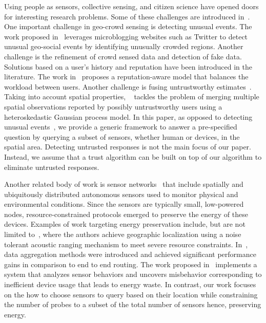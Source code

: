 \documentclass{acm_proc_article-sp}
\begin{document}
Using people as sensors, collective sensing, and citizen science have opened doors for interesting research problems. Some of these challenges are introduced in~\cite{blaschke2011collective}. One important challenge in geo-crowd sensing is detecting unusual events. The work proposed in~\cite{lee2010measuring} leverages microblogging websites such as Twitter to detect unusual geo-social events by identifying unusually crowded regions. Another challenge is the refinement of crowd sensed data and detection of fake data. Solutions based on a user's history and reputation have been introduced in the literature. The work in~\cite{yu2013reputation} proposes a reputation-aware model that balances the workload between users. Another challenge is fusing untrustworthy estimates~\cite{venanzi2013trust}. Taking into account spatial properties, ~\cite{venanzi2013crowdsourcing} tackles the problem of merging multiple spatial observations reported by possibly untrustworthy users using a heteroskedastic Gaussian process model. In this paper, as opposed to detecting unusual events~\cite{blaschke2011collective}, we provide a generic framework to answer a pre-specified question by querying a subset of sensors, whether human or devices, in the spatial area. Detecting untrusted responses is not the main focus of our paper. Instead, we assume that a trust algorithm can be built on top of our algorithm to eliminate untrusted responses.\par

Another related body of work is sensor networks~\cite{akyildiz2002survey} that include spatially and ubiquitously distributed autonomous sensors used to monitor physical and environmental conditions. Since the sensors are typically small, low-powered nodes, resource-constrained protocols emerged to preserve the energy of these devices. Examples of work targeting energy preservation include, but are not limited to~\cite{sallai2004acoustic}, where the authors achieve geographic localization using a noise tolerant acoustic ranging mechanism to meet severe resource constraints. In~\cite{krishnamachari2002impact}, data aggregation methods were introduced and achieved significant performance gains in comparison to end to end routing. The work proposed in~\cite{fontugne2013strip} implements a system that analyzes sensor behaviors and uncovers misbehavior corresponding to inefficient device usage that leads to energy waste. In contrast, our work focuses on the how to choose sensors to query based on their location while constraining the number of probes to a subset of the total number of sensors hence, preserving energy.
\end{document}
